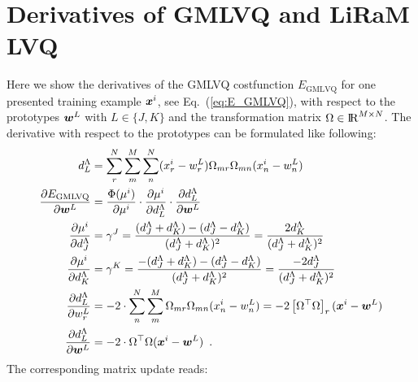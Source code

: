 
\section{Derivatives of GMLVQ and LiRaM LVQ}\label{app:GMLVQ_derivatives}

Here we show the derivatives of the \ac{GMLVQ} costfunction $E_{\mathrm{GMLVQ}}$ for one presented training 
example $\boldsymbol{x}^i$, see Eq.\ (\ref{eq:E_GMLVQ}), 
with respect to the prototypes $\boldsymbol{w}^L$ with $L\in\{J,K\}$ and the transformation matrix $\Omega\in{\rm I\!R}^{M\times N}$. 
The derivative with respect to the prototypes can be formulated like following:
\begin{align}
d^\Lambda_L &= \sum^N_r\sum^M_m\sum^N_n (x^i_r-w^L_r)\Omega_{mr}\Omega_{mn}(x^i_n-w^L_n) \\
% 
\frac{\partial E_{\mathrm{GMLVQ}}}{\partial \v{w}^L} &= \frac{\Phi(\mu^i)}{\partial \mu^i}\cdot\frac{\partial \mu^i}{\partial d^\Lambda_L}
\cdot\frac{\partial d^\Lambda_L}{\partial \v{w}^L} \\
% 
\frac{\partial \mu^i}{\partial d_J^\Lambda} &= \gamma^J = 
\frac{(d_J^\Lambda+d_K^\Lambda)-(d_J^\Lambda-d_K^\Lambda)}{(d_J^\Lambda+d_K^\Lambda)^2} 
= \frac{2d_K^\Lambda}{(d_J^\Lambda+d_K^\Lambda)^2} \\
% 
\frac{\partial \mu^i}{\partial d_K^\Lambda} &= \gamma^K = 
\frac{-(d_J^\Lambda+d_K^\Lambda)-(d_J^\Lambda-d_K^\Lambda)}{(d_J^\Lambda+d_K^\Lambda)^2}
= \frac{-2d_J^\Lambda}{(d_J^\Lambda+d_K^\Lambda)^2} \\
% 
\frac{\partial d_L^\Lambda}{\partial w^L_{r}} &= -2\cdot\sum_n^N\sum_m^M \Omega_{mr}\Omega_{mn}(x^i_n-w^L_{n}) %
= -2\left[\Omega^\top\Omega\right]_r(\vec{x}^i-\vec{w}^L) \\
\frac{\partial d_L^\Lambda}{\partial \v{w}^L}&= -2\cdot\Omega^\top\Omega(\v{x}^i-\v{w}^L) \enspace .
\end{align}
The corresponding matrix update reads:
